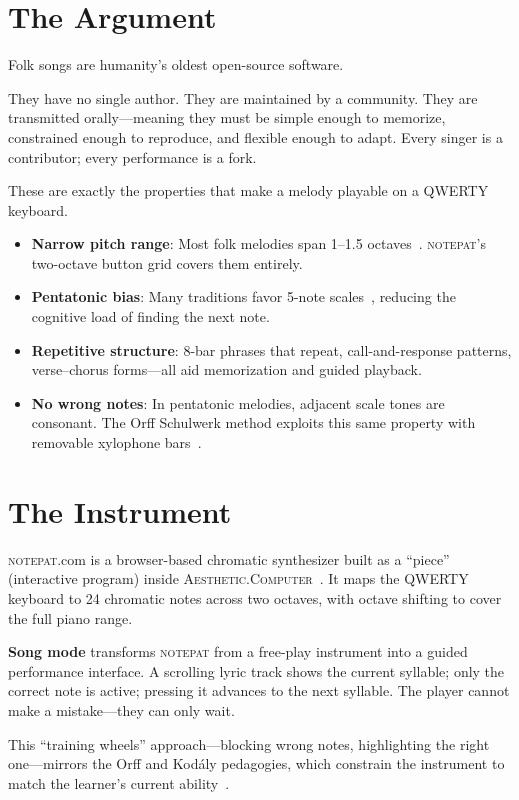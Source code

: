 \documentclass[10pt,letterpaper,twocolumn]{article}
\newcommand{\ac}{\textsc{Aesthetic.Computer}}
\newcommand{\np}{\textsc{notepat}}
\begin{document}
\section{The Argument}

Folk songs are humanity's oldest open-source software.

They have no single author. They are maintained by a community. They are transmitted orally---meaning they must be simple enough to memorize, constrained enough to reproduce, and flexible enough to adapt. Every singer is a contributor; every performance is a fork.

These are exactly the properties that make a melody playable on a QWERTY keyboard.

\begin{itemize}
  \item \textbf{Narrow pitch range}: Most folk melodies span 1--1.5 octaves~\citep{lomax1968folk}. \np{}'s two-octave button grid covers them entirely.
  \item \textbf{Pentatonic bias}: Many traditions favor 5-note scales~\citep{kodaly1971folk}, reducing the cognitive load of finding the next note.
  \item \textbf{Repetitive structure}: 8-bar phrases that repeat, call-and-response patterns, verse--chorus forms---all aid memorization and guided playback.
  \item \textbf{No wrong notes}: In pentatonic melodies, adjacent scale tones are consonant. The Orff Schulwerk method exploits this same property with removable xylophone bars~\citep{orff1978schulwerk}.
\end{itemize}

\section{The Instrument}

\np{}.com is a browser-based chromatic synthesizer built as a ``piece'' (interactive program) inside \ac{}~\citep{scudder2026ac, scudder2026notepat}. It maps the QWERTY keyboard to 24 chromatic notes across two octaves, with octave shifting to cover the full piano range.

\textbf{Song mode} transforms \np{} from a free-play instrument into a guided performance interface. A scrolling lyric track shows the current syllable; only the correct note is active; pressing it advances to the next syllable. The player cannot make a mistake---they can only wait.

This ``training wheels'' approach---blocking wrong notes, highlighting the right one---mirrors the Orff and Kod\'aly pedagogies, which constrain the instrument to match the learner's current ability~\citep{kodaly1971folk, orff1978schulwerk}.
\end{document}
